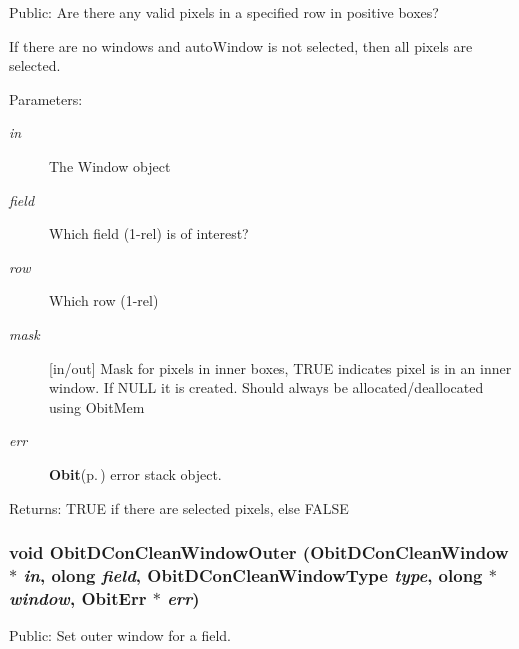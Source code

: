 Public: Are there any valid pixels in a specified row in positive boxes? 

If there are no windows and auto\-Window is not selected, then all pixels are selected. \begin{Desc}
\item[Parameters:]
\begin{description}
\item[{\em in}]The Window object \item[{\em field}]Which field (1-rel) is of interest? \item[{\em row}]Which row (1-rel) \item[{\em mask}][in/out] Mask for pixels in inner boxes, TRUE indicates pixel is in an inner window. If NULL it is created. Should always be allocated/deallocated using Obit\-Mem \item[{\em err}]{\bf Obit}{\rm (p.\,\pageref{structObit})} error stack object. \end{description}
\end{Desc}
\begin{Desc}
\item[Returns:]TRUE if there are selected pixels, else FALSE \end{Desc}
\subsubsection{\setlength{\rightskip}{0pt plus 5cm}void Obit\-DCon\-Clean\-Window\-Outer ({\bf Obit\-DCon\-Clean\-Window} $\ast$ {\em in}, {\bf olong} {\em field}, {\bf Obit\-DCon\-Clean\-Window\-Type} {\em type}, {\bf olong} $\ast$ {\em window}, {\bf Obit\-Err} $\ast$ {\em err})}\label{ObitDConCleanWindow_8c_a22}


Public: Set outer window for a field. 

